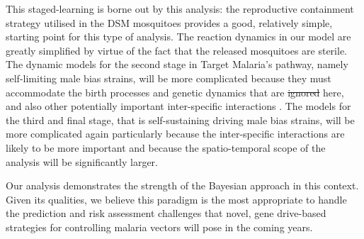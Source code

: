 \documentclass[]{bmcart}
\providecommand{\DIFaddtex}[1]{{\protect\color{blue}\uwave{#1}}} %
\providecommand{\DIFdeltex}[1]{{\protect\color{red}\sout{#1}}}                      %
\providecommand{\DIFaddbegin}{} %
\providecommand{\DIFaddend}{} %
\providecommand{\DIFdelbegin}{} %
\providecommand{\DIFdelend}{} %
\providecommand{\DIFadd}[1]{\texorpdfstring{\DIFaddtex{#1}}{#1}} %
\providecommand{\DIFdel}[1]{\texorpdfstring{\DIFdeltex{#1}}{}} %
\newcommand{\DIFscaledelfig}{0.5}
\newlength{\DIFdelgraphicswidth} %
\newlength{\DIFdelgraphicsheight} %
\newcommand{\DIFaddincludegraphics}[2][]{{\color{blue}\fbox{\DIFOincludegraphics[#1]{#2}}}} %
\newcommand{\DIFdelincludegraphics}[2][]{%
\sbox{\DIFdelgraphicsbox}{\DIFOincludegraphics[#1]{#2}}%
\settoboxwidth{\DIFdelgraphicswidth}{\DIFdelgraphicsbox} %
\settoboxtotalheight{\DIFdelgraphicsheight}{\DIFdelgraphicsbox} %
\scalebox{\DIFscaledelfig}{%
\parbox[b]{\DIFdelgraphicswidth}{\usebox{\DIFdelgraphicsbox}\\[-\baselineskip] \rule{\DIFdelgraphicswidth}{0em}}\llap{\resizebox{\DIFdelgraphicswidth}{\DIFdelgraphicsheight}{%
\setlength{\unitlength}{\DIFdelgraphicswidth}%
\begin{picture}(1,1)%
\thicklines\linethickness{2pt} %
{\color[rgb]{1,0,0}\put(0,0){\framebox(1,1){}}}%
{\color[rgb]{1,0,0}\put(0,0){\line( 1,1){1}}}%
{\color[rgb]{1,0,0}\put(0,1){\line(1,-1){1}}}%
\end{picture}%
}\hspace*{3pt}}} %
} %
\DeclareRobustCommand{\DIFaddbegin}{\DIFOaddbegin \let\includegraphics\DIFaddincludegraphics} %
\DeclareRobustCommand{\DIFaddend}{\DIFOaddend \let\includegraphics\DIFOincludegraphics} %
\DeclareRobustCommand{\DIFdelbegin}{\DIFOdelbegin \let\includegraphics\DIFdelincludegraphics} %
\DeclareRobustCommand{\DIFdelend}{\DIFOaddend \let\includegraphics\DIFOincludegraphics} %
\begin{document}
This staged-learning is borne out by this analysis: the reproductive containment strategy utilised in the DSM mosquitoes provides a good, relatively simple, starting point for this type of analysis. The reaction dynamics in our model are greatly simplified by virtue of the fact that the released mosquitoes are sterile. The dynamic models for the second stage in Target Malaria's pathway, namely self-limiting male bias strains, will be more complicated because they must accommodate the birth processes and genetic dynamics that are \DIFdelbegin \DIFdel{ignored }\DIFdelend \DIFaddbegin \DIFadd{not relevant }\DIFaddend here, and also other potentially important inter-specific interactions \citep{Beeton2020}. The models for the third and final stage, that is self-sustaining driving male bias strains, will be more complicated again particularly because the inter-specific interactions are likely to be more important and because the spatio-temporal scope of the analysis will be significantly larger.

Our analysis demonstrates the strength of the Bayesian approach in this context. Given its qualities, we believe this paradigm is the most appropriate to handle the prediction and risk assessment challenges that novel, gene drive-based strategies for controlling malaria vectors will pose in the coming years.

\end{document}
